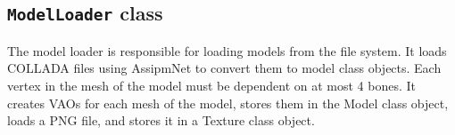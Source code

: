\subsection{\texttt{ModelLoader} class}\label{model_loader}

The model loader is responsible for loading models from the file system.
It loads COLLADA files using AssipmNet to convert them to model class objects.
Each vertex in the mesh of the model must be dependent on at most 4 bones.
It creates VAOs for each mesh of the model, stores them in the Model class object, loads a PNG file, and stores it in a Texture class object.
